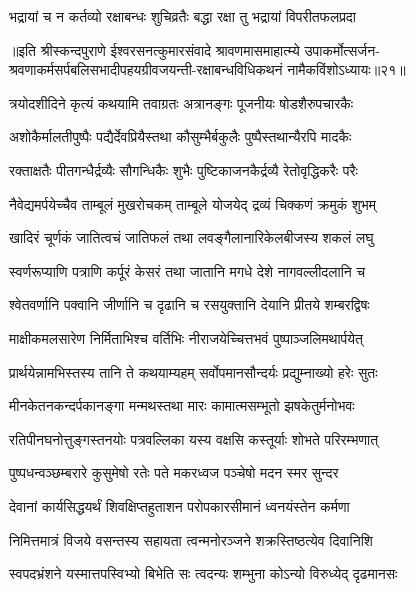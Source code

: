 \twolineshloka
{भद्रायां च न कर्तव्यो रक्षाबन्धः शुचिव्रतैः}
{बद्धा रक्षा तु भद्रायां विपरीतफलप्रदा} %


{॥इति श्रीस्कन्दपुराणे ईश्वरसनत्कुमारसंवादे श्रावणमासमाहात्म्ये उपाकर्मोत्सर्जन-श्रवणाकर्मसर्पबलिसभादीपहयग्रीवजयन्ती-रक्षाबन्धविधिकथनं नामैकविंशोऽध्यायः॥२१॥}





\twolineshloka
{त्रयोदशीदिने कृत्यं कथयामि तवाग्रतः}
{अत्रानङ्गः पूजनीयः षोडशैरुपचारकैः} %

\twolineshloka
{अशोकैर्मालतीपुष्पैः पद्यैर्देवप्रियैस्तथा}
{कौसुम्भैर्बकुलैः पुष्पैस्तथान्यैरपि मादकैः} %

\twolineshloka
{रक्ताक्षतैः पीतगन्धैर्द्रव्यैः सौगन्धिकैः शुभैः}
{पुष्टिकाजनकैर्द्रव्यै रेतोवृद्धिकरैः परैः} %

\twolineshloka
{नैवेद्यमर्पयेच्चैव ताम्बूलं मुखरोचकम्}
{ताम्बूले योजयेद् द्रव्यं चिक्कणं क्रमुकं शुभम्} %

\twolineshloka
{खादिरं चूर्णकं जातित्वचं जातिफलं तथा}
{लवङ्गैलानारिकेलबीजस्य शकलं लघु} %

\twolineshloka
{स्वर्णरूप्याणि पत्राणि कर्पूरं केसरं तथा}
{जातानि मगधे देशे नागवल्लीदलानि च} %

\twolineshloka
{श्वेतवर्णानि पक्वानि जीर्णानि च दृढानि च}
{रसयुक्तानि देयानि प्रीतये शम्बरद्विषः} %

\twolineshloka
{माक्षीकमलसारेण निर्मिताभिश्च वर्तिभिः}
{नीराजयेच्चित्तभवं पुष्पाञ्जलिमथार्पयेत्} %

\twolineshloka
{प्रार्थयेन्नामभिस्तस्य तानि ते कथयाम्यहम्}
{सर्वोपमानसौन्दर्यः प्रद्युम्नाख्यो हरेः सुतः} %

\twolineshloka
{मीनकेतनकन्दर्पकानङ्गा मन्मथस्तथा}
{मारः कामात्मसम्भूतो झषकेतुर्मनोभवः} %

\twolineshloka
{रतिपीनघनोत्तुङ्गस्तनयोः पत्रवल्लिका}
{यस्य वक्षसि कस्तूर्याः शोभते परिरम्भणात्} %

\twolineshloka
{पुष्पधन्वञ्छम्बरारे कुसुमेषो रतेः पते}
{मकरध्वज पञ्चेषो मदन स्मर सुन्दर} %

\twolineshloka
{देवानां कार्यसिद्धयर्थं शिवक्षिप्तहुताशन}
{परोपकारसीमानं ध्वनयंस्तेन कर्मणा} %

\twolineshloka
{निमित्तमात्रं विजये वसन्तस्य सहायता}
{त्वन्मनोरञ्जने शक्रस्तिष्ठत्येव दिवानिशि} %

\twolineshloka
{स्वपदभ्रंशने यस्मात्तपस्विभ्यो बिभेति सः}
{त्वदन्यः शम्भुना कोऽन्यो विरुध्येद् दृढमानसः} %

